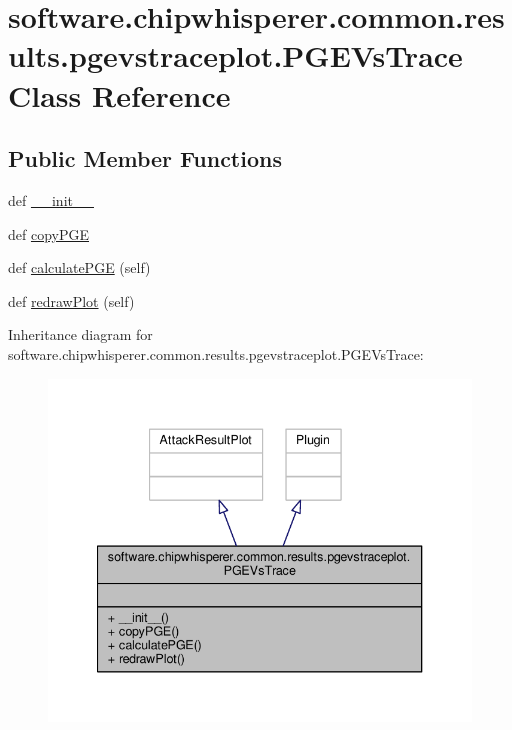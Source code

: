 \hypertarget{classsoftware_1_1chipwhisperer_1_1common_1_1results_1_1pgevstraceplot_1_1PGEVsTrace}{}\section{software.\+chipwhisperer.\+common.\+results.\+pgevstraceplot.\+P\+G\+E\+Vs\+Trace Class Reference}
\label{classsoftware_1_1chipwhisperer_1_1common_1_1results_1_1pgevstraceplot_1_1PGEVsTrace}
\subsection*{Public Member Functions}
\begin{DoxyCompactItemize}
\item 
def \hyperlink{classsoftware_1_1chipwhisperer_1_1common_1_1results_1_1pgevstraceplot_1_1PGEVsTrace_ab7541e852bbef4d40c4fc14646006e6d}{\+\_\+\+\_\+init\+\_\+\+\_\+}
\item 
def \hyperlink{classsoftware_1_1chipwhisperer_1_1common_1_1results_1_1pgevstraceplot_1_1PGEVsTrace_a8a9d71b5b6a422510d16b0da496a29f0}{copy\+P\+G\+E}
\item 
def \hyperlink{classsoftware_1_1chipwhisperer_1_1common_1_1results_1_1pgevstraceplot_1_1PGEVsTrace_ad1074cc8b19ffa1cc7cc156b4d7799f9}{calculate\+P\+G\+E} (self)
\item 
def \hyperlink{classsoftware_1_1chipwhisperer_1_1common_1_1results_1_1pgevstraceplot_1_1PGEVsTrace_a7da78636d231527f48261ddf2a4410ba}{redraw\+Plot} (self)
\end{DoxyCompactItemize}


Inheritance diagram for software.\+chipwhisperer.\+common.\+results.\+pgevstraceplot.\+P\+G\+E\+Vs\+Trace\+:\nopagebreak
\begin{figure}[H]
\begin{center}
\leavevmode
\includegraphics[width=340pt]{d4/dbc/classsoftware_1_1chipwhisperer_1_1common_1_1results_1_1pgevstraceplot_1_1PGEVsTrace__inherit__graph}
\end{center}
\end{figure}


